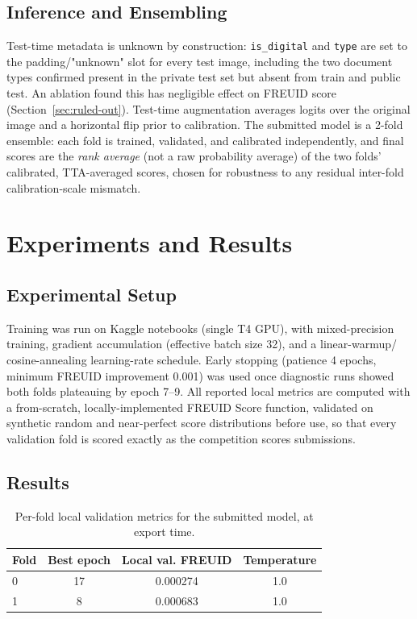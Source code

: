\documentclass{article}
\begin{document}
\subsection{Inference and Ensembling}

Test-time metadata is unknown by construction: \texttt{is\_digital} and
\texttt{type} are set to the padding/"unknown" slot for every test image,
including the two document types confirmed present in the private test set
but absent from train and public test. An ablation found this has
negligible effect on FREUID score (Section~\ref{sec:ruled-out}). Test-time
augmentation averages logits over the original image and a horizontal flip
prior to calibration. The submitted model is a 2-fold ensemble: each fold
is trained, validated, and calibrated independently, and final scores are
the \emph{rank average} (not a raw probability average) of the two folds'
calibrated, TTA-averaged scores, chosen for robustness to any residual
inter-fold calibration-scale mismatch.

\section{Experiments and Results}
\label{sec:experiments}

\subsection{Experimental Setup}

Training was run on Kaggle notebooks (single T4 GPU), with mixed-precision
training, gradient accumulation (effective batch size 32), and a linear-warmup/
cosine-annealing learning-rate schedule. Early stopping (patience 4 epochs,
minimum FREUID improvement 0.001) was used once diagnostic runs showed both
folds plateauing by epoch 7--9. All reported local metrics are computed with
a from-scratch, locally-implemented FREUID Score function, validated on
synthetic random and near-perfect score distributions before use, so that
every validation fold is scored exactly as the competition scores
submissions.

\subsection{Results}

\begin{table}[t]
\centering
\caption{Per-fold local validation metrics for the submitted model, at
export time.}
\label{tab:fold-metrics}
\begin{tabular}{@{}lccc@{}}
\toprule
Fold & Best epoch & Local val. FREUID & Temperature \\
\midrule
0 & 17 & 0.000274 & 1.0 \\
1 & 8  & 0.000683 & 1.0 \\
\bottomrule
\end{tabular}
\end{table}
\end{document}
